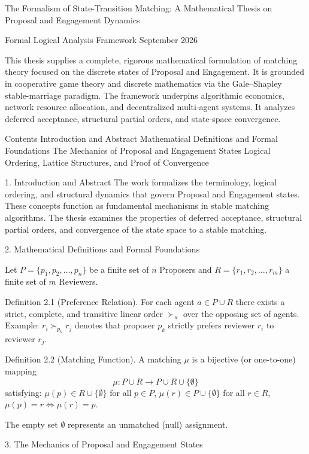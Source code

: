 The Formalism of State-Transition Matching: A Mathematical Thesis on Proposal and Engagement Dynamics

Formal Logical Analysis Framework  
September 2026

This thesis supplies a complete, rigorous mathematical formulation of matching theory focused on the discrete states of Proposal and Engagement. It is grounded in cooperative game theory and discrete mathematics via the Gale–Shapley stable-marriage paradigm. The framework underpins algorithmic economics, network resource allocation, and decentralized multi-agent systems. It analyzes deferred acceptance, structural partial orders, and state-space convergence.

Contents
Introduction and Abstract  
Mathematical Definitions and Formal Foundations  
The Mechanics of Proposal and Engagement States  
Logical Ordering, Lattice Structures, and Proof of Convergence  

1. Introduction and Abstract
The work formalizes the terminology, logical ordering, and structural dynamics that govern Proposal and Engagement states. These concepts function as fundamental mechanisms in stable matching algorithms. The thesis examines the properties of deferred acceptance, structural partial orders, and convergence of the state space to a stable matching.

2. Mathematical Definitions and Formal Foundations

Let \( P = \{p_1, p_2, \dots, p_n\} \) be a finite set of \( n \) Proposers and \( R = \{r_1, r_2, \dots, r_m\} \) a finite set of \( m \) Reviewers.

Definition 2.1 (Preference Relation).  
For each agent \( a \in P \cup R \) there exists a strict, complete, and transitive linear order \( \succ_a \) over the opposing set of agents.  
Example: \( r_i \succ_{p_k} r_j \) denotes that proposer \( p_k \) strictly prefers reviewer \( r_i \) to reviewer \( r_j \).

Definition 2.2 (Matching Function).  
A matching \( \mu \) is a bijective (or one-to-one) mapping  
\[
\mu : P \cup R \to P \cup R \cup \{\emptyset\}
\]  
satisfying:
\( \mu(p) \in R \cup \{\emptyset\} \) for all \( p \in P \),  
\( \mu(r) \in P \cup \{\emptyset\} \) for all \( r \in R \),  
\( \mu(p) = r \iff \mu(r) = p \).

The empty set \( \emptyset \) represents an unmatched (null) assignment.

3. The Mechanics of Proposal and Engagement States

